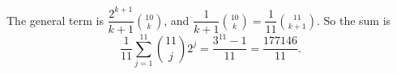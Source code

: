 The general term is $\dfrac{2^{k+1}}{k+1}\binom{10}k$, and $\dfrac1{k+1}\binom{10}k=\dfrac1{11}\binom{11}{k+1}$. So the sum is
\[\dfrac1{11}\sum_{j=1}^{11}\binom{11}{j}2^j=\dfrac{3^{11}-1}{11}=\boxed{\dfrac{177146}{11}}.\]
